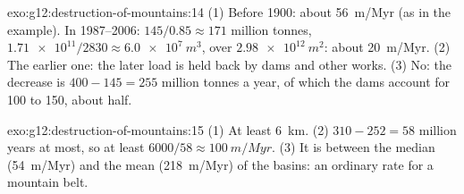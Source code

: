 \begin{solution}{exo:g12:destruction-of-mountains:14}
(1) Before 1900: about \qty{56}{m/Myr} (as in the example). In
1987--2006: $145/0.85 \approx 171$ million tonnes, $\num{1.71e11}/2830
\approx \qty{6.0e7}{m^3}$, over $\qty{2.98e12}{m^2}$: about
\qty{20}{m/Myr}. (2) The earlier one: the later load is held back by dams
and other works. (3) No: the decrease is $400 - 145 = 255$ million tonnes a
year, of which the dams account for 100 to 150, about half.
\end{solution}

\begin{solution}{exo:g12:destruction-of-mountains:15}
(1) At least \qty{6}{km}. (2) $310 - 252 = 58$ million years at most, so at
least $6000/58 \approx \qty{100}{m/Myr}$. (3) It is between the median
(\qty{54}{m/Myr}) and the mean (\qty{218}{m/Myr}) of the basins: an ordinary
rate for a mountain belt.
\end{solution}

